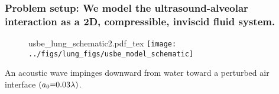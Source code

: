 \begin{frame} \frametitle{Problem setup: We model the ultrasound-alveolar interaction as a 2D, compressible, inviscid fluid system.}
  \begin{figure}
    \centering
    \def\svgwidth{0.48\textwidth}
    {\footnotesize
      {usbe_lung_schematic2.pdf_tex} \hfill%
    }
    \texttt{[image: ../figs/lung\_figs/usbe\_model\_schematic]} \hfill
  \end{figure}
  An acoustic wave impinges downward from water toward a perturbed air interface $(a_0\equals0.03\lambda)$.
\end{frame}
